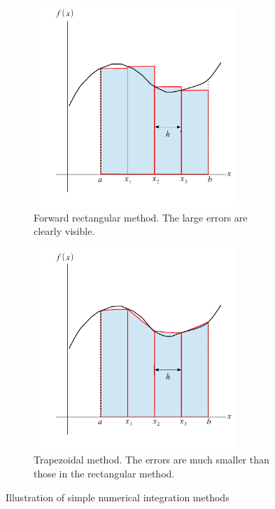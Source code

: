 \begin{figure}
	\centering
	\begin{subfigure}{0.45\textwidth}
		\centering
		\includegraphics[width=3in]{03.integrals/int-rectangle.pdf}
		\caption{Forward rectangular method. The large errors are clearly visible.}
		\label{fig:int-rectangle}
	\end{subfigure}
	\begin{subfigure}{0.45\textwidth}
		\centering 
		\includegraphics[width=3in]{03.integrals/int-trapezoid.pdf}
		\caption{Trapezoidal method. The errors are much smaller than those in the rectangular method.}
		\label{fig:int-trapezoid}
	\end{subfigure}
	\caption{Illustration of simple numerical integration methods}
\end{figure}


